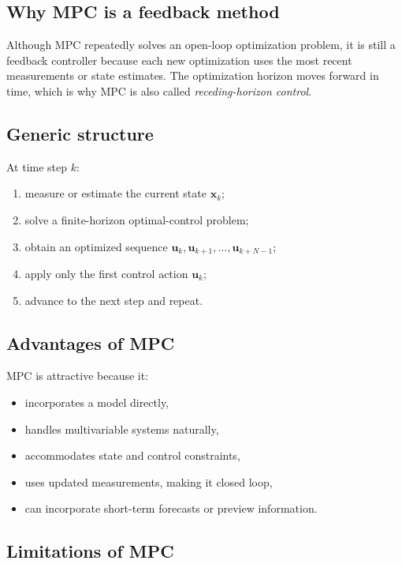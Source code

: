 \documentclass[11pt]{article}
\newcommand{\vect}[1]{\boldsymbol{#1}}
\newcommand{\xstate}{\vect{x}}
\newcommand{\uvec}{\vect{u}}
\begin{document}
\subsection{Why MPC is a feedback method}

Although MPC repeatedly solves an open-loop optimization problem, it is still a feedback controller because each new optimization uses the most recent measurements or state estimates. The optimization horizon moves forward in time, which is why MPC is also called \emph{receding-horizon control}.

\subsection{Generic structure}

At time step $k$:
\begin{enumerate}[leftmargin=1.5em]
  \item measure or estimate the current state $\xstate_k$;
  \item solve a finite-horizon optimal-control problem;
  \item obtain an optimized sequence $\uvec_k,\uvec_{k+1},\ldots,\uvec_{k+N-1}$;
  \item apply only the first control action $\uvec_k$;
  \item advance to the next step and repeat.
\end{enumerate}

\subsection{Advantages of MPC}

MPC is attractive because it:
\begin{itemize}[leftmargin=1.4em]
  \item incorporates a model directly,
  \item handles multivariable systems naturally,
  \item accommodates state and control constraints,
  \item uses updated measurements, making it closed loop,
  \item can incorporate short-term forecasts or preview information.
\end{itemize}

\subsection{Limitations of MPC}
\end{document}
